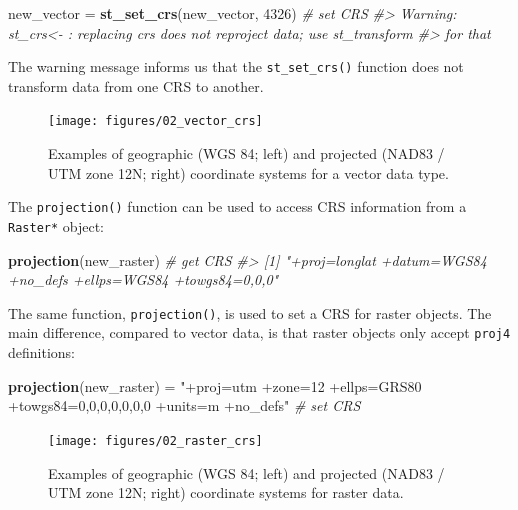 \documentclass[]{krantz}
\newenvironment{Shaded}{\begin{snugshade}}{\end{snugshade}}
\newcommand{\CommentTok}[1]{\textcolor[rgb]{0.37,0.37,0.37}{\textit{#1}}}
\newcommand{\DecValTok}[1]{\textcolor[rgb]{0.06,0.06,0.06}{#1}}
\newcommand{\KeywordTok}[1]{\textcolor[rgb]{0.27,0.27,0.27}{\textbf{#1}}}
\newcommand{\NormalTok}[1]{#1}
\newcommand{\StringTok}[1]{\textcolor[rgb]{0.5,0.5,0.5}{#1}}
\begin{document}
\begin{Shaded}
\begin{Highlighting}[]
\NormalTok{new_vector =}\StringTok{ }\KeywordTok{st_set_crs}\NormalTok{(new_vector, }\DecValTok{4326}\NormalTok{) }\CommentTok{# set CRS}
\CommentTok{#> Warning: st_crs<- : replacing crs does not reproject data; use st_transform}
\CommentTok{#> for that}
\end{Highlighting}
\end{Shaded}

The warning message informs us that the \texttt{st\_set\_crs()} function does not transform data from one CRS to another.

\begin{figure}[t]

{\centering \texttt{[image: figures/02\_vector\_crs]} 

}

\caption[Examples of geographic and projected CRSs (vector data).]{Examples of geographic (WGS 84; left) and projected (NAD83 / UTM zone 12N; right) coordinate systems for a vector data type.}\label{fig:vector-crs}
\end{figure}

The \texttt{projection()} function can be used to access CRS information from a \texttt{Raster*} object:

\begin{Shaded}
\begin{Highlighting}[]
\KeywordTok{projection}\NormalTok{(new_raster) }\CommentTok{# get CRS}
\CommentTok{#> [1] "+proj=longlat +datum=WGS84 +no_defs +ellps=WGS84 +towgs84=0,0,0"}
\end{Highlighting}
\end{Shaded}

The same function, \texttt{projection()}, is used to set a CRS for raster objects.
The main difference, compared to vector data, is that raster objects only accept \texttt{proj4} definitions:

\begin{Shaded}
\begin{Highlighting}[]
\KeywordTok{projection}\NormalTok{(new_raster) =}\StringTok{ "+proj=utm +zone=12 +ellps=GRS80 +towgs84=0,0,0,0,0,0,0 }
\StringTok{                            +units=m +no_defs"} \CommentTok{# set CRS}
\end{Highlighting}
\end{Shaded}

\begin{figure}[t]

{\centering \texttt{[image: figures/02\_raster\_crs]} 

}

\caption[Examples of geographic and projected CRSs (raster data).]{Examples of geographic (WGS 84; left) and projected (NAD83 / UTM zone 12N; right) coordinate systems for raster data.}\label{fig:raster-crs}
\end{figure}
\end{document}
